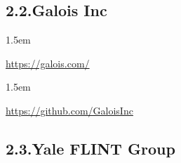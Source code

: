 \documentclass[12pt,twoside]{article}
\begin{document}
\subsection{2.2.\hspace*{0.5em}Galois Inc}%

\begin{mddefinitions}%


\begin{mdbmarginx}{}{}{}{1.5em}%
\begin{mddefdata}%
\href{https://galois.com/}{{\ttfamily https://\hspace{0pt}galois.\hspace{0pt}com/\hspace{0pt}}}
\end{mddefdata}%
\end{mdbmarginx}%


\begin{mdbmarginx}{}{}{}{1.5em}%
\begin{mddefdata}%
\href{https://github.com/GaloisInc}{{\ttfamily https://\hspace{0pt}github.\hspace{0pt}com/\hspace{0pt}GaloisInc}}%
\end{mddefdata}%
\end{mdbmarginx}%
\end{mddefinitions}%

\subsection{2.3.\hspace*{0.5em}Yale FLINT Group}%
\end{document}

